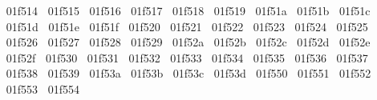 {  ^^^^^^01f514%
  ^^^^^^01f515%
  ^^^^^^01f516%
  ^^^^^^01f517%
  ^^^^^^01f518%
  ^^^^^^01f519%
  ^^^^^^01f51a%
  ^^^^^^01f51b%
  ^^^^^^01f51c%
  ^^^^^^01f51d%
  ^^^^^^01f51e%
  ^^^^^^01f51f%
  ^^^^^^01f520%
  ^^^^^^01f521%
  ^^^^^^01f522%
  ^^^^^^01f523%
  ^^^^^^01f524%
  ^^^^^^01f525%
  ^^^^^^01f526%
  ^^^^^^01f527%
  ^^^^^^01f528%
  ^^^^^^01f529%
  ^^^^^^01f52a%
  ^^^^^^01f52b%
  ^^^^^^01f52c%
  ^^^^^^01f52d%
  ^^^^^^01f52e%
  ^^^^^^01f52f%
  ^^^^^^01f530%
  ^^^^^^01f531%
  ^^^^^^01f532%
  ^^^^^^01f533%
  ^^^^^^01f534%
  ^^^^^^01f535%
  ^^^^^^01f536%
  ^^^^^^01f537%
  ^^^^^^01f538%
  ^^^^^^01f539%
  ^^^^^^01f53a%
  ^^^^^^01f53b%
  ^^^^^^01f53c%
  ^^^^^^01f53d%
  ^^^^^^01f550%
  ^^^^^^01f551%
  ^^^^^^01f552%
  ^^^^^^01f553%
  ^^^^^^01f554%
}
